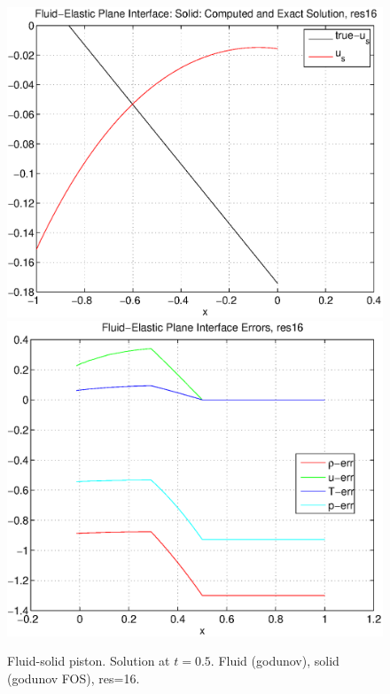 {\begin{figure}[hbt]
\includegraphics[width=\fwidth]{fluidElastic_planeInterfacegSolid_res16.eps}
\includegraphics[width=\fwidth]{fluidElastic_planeInterfacegErr_res16.eps}
\caption{Fluid-solid piston. Solution at $t=0.5$. Fluid (godunov), solid (godunov FOS), res=16.}
\label{fig:fluidSolidPistonFOSG16}
\end{figure}
% 
}
